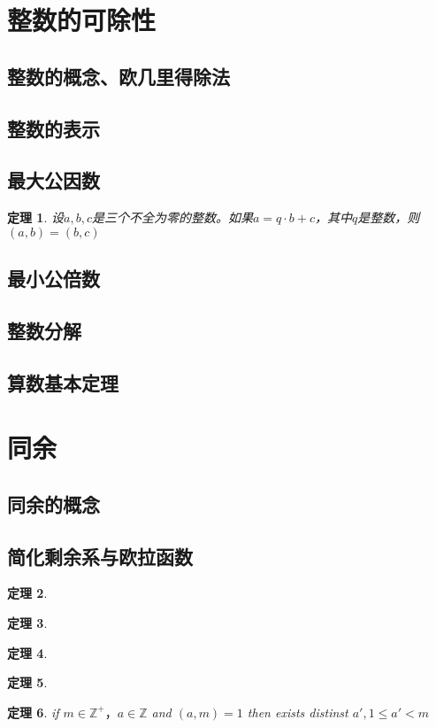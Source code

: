 \documentclass[a4paper]{article}
\newtheorem{theorem}{定理}[subsection]
\begin{document}
\section{整数的可除性}
\subsection{整数的概念、欧几里得除法}
\subsection{整数的表示}
\subsection{最大公因数}
\begin{theorem}
    设$a,b,c$是三个不全为零的整数。如果$a=q\cdot b+c$，其中$q$是整数，则$(a,b)=(b,c)$
\end{theorem}
\subsection{最小公倍数}
\subsection{整数分解}
\subsection{算数基本定理}
\section{同余}
\subsection{同余的概念}
\subsection{}
\subsection{简化剩余系与欧拉函数}
\begin{theorem}\end{theorem}
\begin{theorem}\end{theorem}
\begin{theorem}\end{theorem}
\begin{theorem}\end{theorem}
\begin{theorem}
    if $m\in\mathbb{Z^+}，a\in\mathbb{Z}$ and $(a,m)=1$ then exists distinst $a',1\leq a'<m$
\end{theorem}
\end{document}
